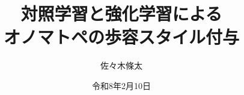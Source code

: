 \documentclass[a4paper,12pt]{jreport}
\title{対照学習と強化学習による\\オノマトペの歩容スタイル付与}
\affiliation{大阪大学基礎工学部システム科学科知能システム学コース}
\author{佐々木條太}
\date{令和8年2月10日}
\begin{document}
\maketitle       %
\tableofcontents %
\thispagestyle{empty}
\listoffigures %
\thispagestyle{empty}
\listoftables %
\thispagestyle{empty}
\newpage

\setcounter{page}{1}			%
\def\thepage{\arabic{page}}     %
\pagestyle{fancy}
\renewcommand{\chaptermark}[1]{\markboth{第\ \thechapter\ 章 #1}{}}
\renewcommand{\sectionmark}[1]{\markright{\thesection.\ #1}}

% 
\end{document}
